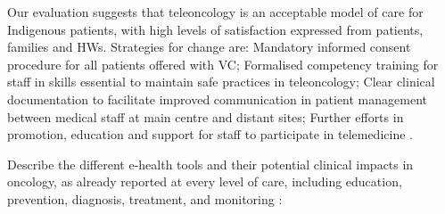 Our evaluation suggests that teleoncology is an acceptable model of care for Indigenous patients, with high levels of satisfaction expressed from patients, families and HWs. Strategies for change are: Mandatory informed consent procedure for all patients offered with VC; Formalised competency training for staff in skills essential to maintain safe practices in teleoncology; Clear clinical documentation to facilitate improved communication in patient management between medical staff at main centre and distant sites; Further efforts in promotion, education and support for staff to participate in telemedicine \cite{mooi_teleoncology_2012}.

Describe the different e-health tools and their potential clinical impacts in oncology, as already reported at every level of care, including education, prevention, diagnosis, treatment, and monitoring \cite{bertucci_outpatient_2019}:

